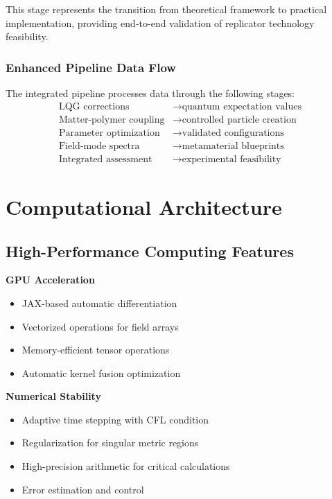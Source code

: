 \documentclass[11pt]{article}
\begin{document}
This stage represents the transition from theoretical framework to practical implementation, providing end-to-end validation of replicator technology feasibility.

\subsubsection{Enhanced Pipeline Data Flow}

The integrated pipeline processes data through the following stages:
\begin{align}
\text{LQG corrections} &\rightarrow \text{quantum expectation values} \\
\text{Matter-polymer coupling} &\rightarrow \text{controlled particle creation} \\
\text{Parameter optimization} &\rightarrow \text{validated configurations} \\
\text{Field-mode spectra} &\rightarrow \text{metamaterial blueprints} \\
\text{Integrated assessment} &\rightarrow \text{experimental feasibility}
\end{align}

\section{Computational Architecture}

\subsection{High-Performance Computing Features}

\textbf{GPU Acceleration}
\begin{itemize}
\item JAX-based automatic differentiation
\item Vectorized operations for field arrays
\item Memory-efficient tensor operations
\item Automatic kernel fusion optimization
\end{itemize}

\textbf{Numerical Stability}
\begin{itemize}
\item Adaptive time stepping with CFL condition
\item Regularization for singular metric regions
\item High-precision arithmetic for critical calculations
\item Error estimation and control
\end{itemize}
\end{document}
